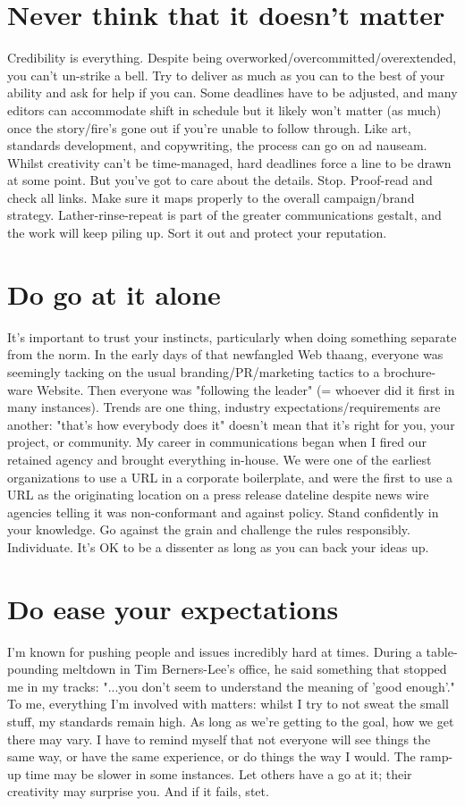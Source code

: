 \section*{Never think that it doesn't matter}
Credibility is everything. Despite being overworked/overcommitted/overextended, you can't un-strike a bell. Try to deliver as much as you can to the best of your ability and ask for help if you can. Some deadlines have to be adjusted, and many editors can accommodate shift in schedule but it likely won't matter (as much) once the story/fire's gone out if you're unable to follow through. Like art, standards development, and copywriting, the process can go on ad nauseam. Whilst creativity can't be time-managed, hard deadlines force a line to be drawn at some point. But you've got to care about the details. Stop. Proof-read and check all links. Make sure it maps properly to the overall campaign/brand strategy. Lather-rinse-repeat is part of the greater communications gestalt, and the work will keep piling up. Sort it out and protect your reputation.

\section*{Do go at it alone}
It's important to trust your instincts, particularly when doing something separate from the norm. In the early days of that newfangled Web thaang, everyone was seemingly tacking on the usual branding/PR/marketing tactics to a brochure-ware Website. Then everyone was "following the leader" (= whoever did it first in many instances). Trends are one thing, industry expectations/requirements are another: "that's how everybody does it" doesn't mean that it's right for you, your project, or community. My career in communications began when I fired our retained agency and brought everything in-house. We were one of the earliest organizations to use a URL in a corporate boilerplate, and were the first to use a URL as the originating location on a press release dateline despite news wire agencies telling it was non-conformant and against policy. Stand confidently in your knowledge. Go against the grain and challenge the rules responsibly. Individuate. It's OK to be a dissenter as long as you can back your ideas up.

\section*{Do ease your expectations}
I'm known for pushing people and issues incredibly hard at times. During a table-pounding meltdown in Tim Berners-Lee's office, he said something that stopped me in my tracks: "...you don't seem to understand the meaning of 'good enough'." To me, everything I’m involved with matters: whilst I try to not sweat the small stuff, my standards remain high. As long as we're getting to the goal, how we get there may vary. I have to remind myself that not everyone will see things the same way, or have the same experience, or do things the way I would. The ramp-up time may be slower in some instances. Let others have a go at it; their creativity may surprise you. And if it fails, stet.

